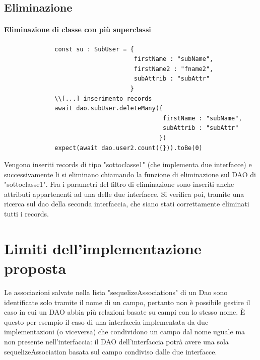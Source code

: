 \documentclass[a4paper, 12pt]{report}
\begin{document}
        \subsection{Eliminazione}
          \paragraph{Eliminazione di classe con più superclassi}
            \begin{Verbatim}
              const su : SubUser = {
                                    firstName : "subName",
                                    firstName2 : "fname2",
                                    subAttrib : "subAttr"
                                   }
              \\[...] inserimento records
              await dao.subUser.deleteMany({
                                            firstName : "subName",
                                            subAttrib : "subAttr"
                                           })
              expect(await dao.user2.count({})).toBe(0)
            \end{Verbatim}
            Vengono inseriti records di tipo "sottoclasse1" (che implementa due interfacce) e successivamente li si eliminano chiamando la funzione di eliminazione sul DAO di "sottoclasse1".
            Fra i parametri del filtro di eliminazione sono inseriti anche attributi appartenenti ad una delle due interfacce.
            Si verifica poi, tramite una ricerca sul dao della seconda interfaccia, che siano stati correttamente eliminati tutti i records.
      \section{Limiti dell'implementazione proposta}
        Le associazioni salvate nella lista "sequelizeAssociations" di un Dao sono identificate solo tramite il nome di un campo, pertanto non è possibile gestire il caso in cui un DAO abbia più relazioni basate su campi con lo stesso nome.
        È questo per esempio il caso di una interfaccia implementata da due implementazioni (o viceversa) che condividono un campo dal nome uguale ma non presente nell'interfaccia: il DAO dell'interfaccia potrà avere una sola sequelizeAssociation basata sul campo condiviso dalle due interfacce.
\end{document}
